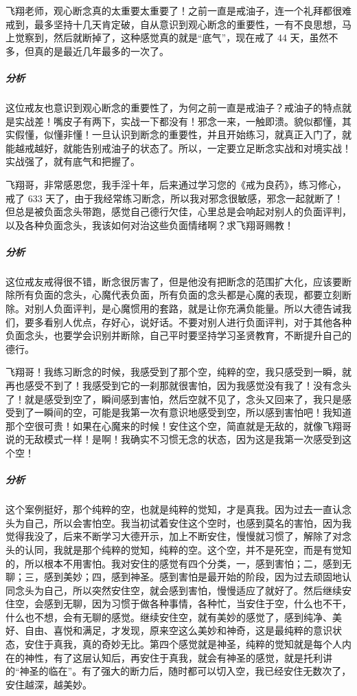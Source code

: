 \begin{case}
    飞翔老师，观心断念真的太重要太重要了！之前一直是戒油子，连一个礼拜都很难戒到，最多坚持十几天肯定破，自从意识到观心断念的重要性，一有不良思想，马上觉察到，然后就断掉了，这种感觉真的就是“底气”，现在戒了 44 天，虽然不多，但真的是最近几年最多的一次了。
    \subparagraph{分析} 这位戒友也意识到观心断念的重要性了，为何之前一直是戒油子？戒油子的特点就是实战差！嘴皮子有两下，实战一下都没有！邪念一来，一触即溃。貌似都懂，其实假懂，似懂非懂！一旦认识到断念的重要性，并且开始练习，就真正入门了，就能越戒越好，就能告别戒油子的状态了。所以，一定要立足断念实战和对境实战！实战强了，就有底气和把握了。
\end{case}

\begin{case}
    飞翔哥，非常感恩您，我手淫十年，后来通过学习您的《戒为良药》，练习修心，戒了 633 天了，由于我经常练习断念，所以我对邪念很敏感，邪念一起就断了！但总是被负面念头带跑，感觉自己德行欠佳，心里总是会响起对别人的负面评判，以及各种负面念头，我该如何对治这些负面情绪啊？求飞翔哥赐教！
    \subparagraph{分析} 这位戒友戒得很不错，断念很厉害了，但是他没有把断念的范围扩大化，应该要断除所有负面的念头，心魔代表负面，所有负面的念头都是心魔的表现，都要立刻断除。对别人负面评判，是心魔惯用的套路，就是让你充满负能量。所以大德告诫我们，要多看别人优点，存好心，说好话。不要对别人进行负面评判，对于其他各种负面念头，也要学会识别并断除，自己平时要坚持学习圣贤教育，不断提升自己的德行。
\end{case}

\begin{case}
    飞翔哥！我练习断念的时候，我感受到了那个空，纯粹的空，我只感受到一瞬，就再也感受不到了！我感受到它的一刹那就很害怕，因为我感觉没有我了！没有念头了！就是感受到空了，瞬间感到害怕，然后空就不见了，念头又回来了，我只是感受到了一瞬间的空，可能是我第一次有意识地感受到空，所以感到害怕吧！我知道那个空很可贵！如果在心魔来的时候！安住这个空，简直就是无敌的，就像飞翔哥说的无敌模式一样！是啊！我确实不习惯无念的状态，因为这是我第一次感受到这个空！
    \subparagraph{分析} 这个案例挺好，那个纯粹的空，也就是纯粹的觉知，才是真我。因为过去一直认念头为自己，所以会害怕空。我当初试着安住这个空时，也感到莫名的害怕，因为我觉得我没了，后来不断学习大德开示，加上不断安住，慢慢就习惯了，解除了对念头的认同，我就是那个纯粹的觉知，纯粹的空。这个空，并不是死空，而是有觉知的，所以根本不用害怕。我对安住的感觉有四个分类，一，感到害怕；二，感到无聊；三，感到美妙；四，感到神圣。感到害怕是最开始的阶段，因为过去顽固地认同念头为自己，所以突然安住空，就会感到害怕，慢慢适应了就好了。然后继续安住空，会感到无聊，因为习惯于做各种事情，各种忙，当安住于空，什么也不干，什么也不想，会有无聊的感觉。继续安住空，就有美妙的感觉了，感到纯净、美好、自由、喜悦和满足，才发现，原来空这么美妙和神奇，这是最纯粹的意识状态，安住于真我，真的奇妙无比。第四个感觉就是神圣，纯粹的觉知就是每个人内在的神性，有了这层认知后，再安住于真我，就会有神圣的感觉，就是托利讲的“神圣的临在”。有了强大的断力后，随时都可以切入空，我已经安住无数次了，安住越深，越美妙。
\end{case}

